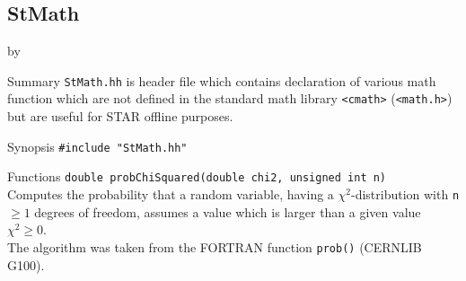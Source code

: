 \documentclass[twoside]{article}
\newcommand{\entrylabel}[1]{\mbox{\textbf{{#1}}}\hfil}%
\newenvironment{entry}
{\begin{list}{}%
    {\renewcommand{\makelabel}{\entrylabel}%
     \setlength{\labelwidth}{90pt}%
     \setlength{\leftmargin}{\labelwidth}
     \advance\leftmargin by \labelsep%
      }%
    }%
  {\end{list}}
\newcommand{\Entrylabel}[1]%
{\raisebox{0pt}[1ex][0pt]{\makebox[\labelwidth][l]%
    {\parbox[t]{\labelwidth}{\hspace{0pt}\textbf{{#1}}}}}}
\newenvironment{Entry}%
{\renewcommand{\entrylabel}{\Entrylabel}\begin{entry}}%
  {\end{entry}}
\begin{document}
\subsection{StMath } \label{StMath} 
\begin{Entry}
\item[Summary]
    \texttt{StMath.hh} is header file which contains declaration of various
    math function which are not defined in the standard math library
    \verb+<cmath>+ (\verb+<math.h>+) but are useful for STAR offline
    purposes.
    
\item[Synopsis]
    \verb+#include "StMath.hh"+ \\
    
    
\item[Functions]
    \verb+double probChiSquared(double chi2, unsigned int n)+\\
    Computes the probability that a random variable, having a
    $\chi^2$-distribution with \texttt{n} $ \ge 1$ degrees of freedom,
    assumes a value which is larger than a given value $\chi^2 \ge 0$.\\
    The algorithm was taken from the FORTRAN function \texttt{prob()}
    (CERNLIB G100).

\end{Entry}

\clearpage

%
%
\end{document}
